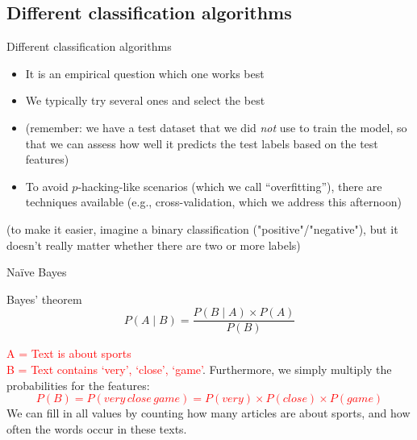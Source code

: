 \documentclass[compress]{beamer}
\begin{document}
\subsection{Different classification algorithms}


\begin{frame}{Different classification algorithms}

\begin{itemize}[<+->]
	\item It is an empirical question which one works best
	\item We typically try several ones and select the best
	\item (remember: we have a test dataset that we did \emph{not} use to train the model, so that we can assess how well it predicts the test labels based on the test features)
	\item To avoid $p$-hacking-like scenarios (which we call ``overfitting''), there are techniques available (e.g., cross-validation, which we address this afternoon)
\end{itemize}
(to make it easier, imagine a binary classification ("positive"/"negative"), but it doesn't really matter whether there are two or more labels)
\end{frame}


\begin{frame}{Naïve Bayes}
	\begin{block}{Bayes' theorem}
		$$ P(A \mid B) = \frac{P(B \mid A) \times P(A)}{P(B)} $$
	\end{block}
	\pause
	\textcolor{red}{A = Text is about sports\\
		B = Text contains `very', `close', `game'}.
	\pause
	Furthermore, we simply multiply the probabilities for the features:
	\textcolor{red}{$$P(B) = P(very\, close\, game) = P(very) \times P(close) \times P(game)$$}
	We can fill in all values by counting how many articles are about sports, and how often the words occur in these texts.
	\vspace{0.3cm}
\end{frame}


\end{document}
